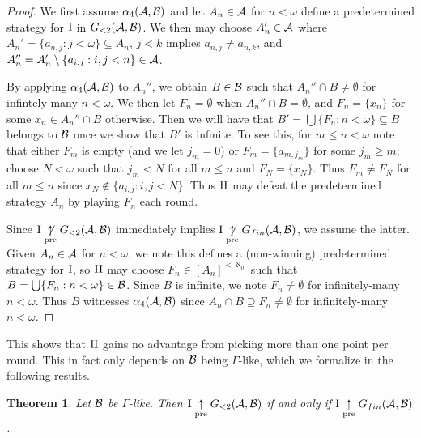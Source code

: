 \documentclass{amsart}
\theoremstyle{plain}
\newtheorem{theorem}{Theorem}
\theoremstyle{definition}
\theoremstyle{remark}
\theoremstyle{plain}
\theoremstyle{definition}
\theoremstyle{remark}
\begin{document}
\begin{proof}
We first assume \(\alpha_4(\mathcal{A},\mathcal{B})\) and let \(A_n\in\mathcal{A}\) for \(n<\omega\)
define a predetermined strategy for \(\mathrm{I}\) in 
\(G_{<2}(\mathcal{A},\mathcal{B})\). We then may choose \(A_n'\in\mathcal{A}\) where
\(A_n'=\{a_{n,j}:j<\omega\}\subseteq A_n\), \(j<k\) implies
\(a_{n,j}\not=a_{n,k}\), and \(A_n''=A_n'\setminus\{a_{i,j}:i,j<n\}\in\mathcal{A}\).

By applying \(\alpha_4(\mathcal{A},\mathcal{B})\) to \(A_n''\), we obtain \(B\in\mathcal{B}\)
such that \(A_n''\cap B\not=\emptyset\) for infintely-many \(n<\omega\).
We then let \(F_n=\emptyset\) when \(A_n''\cap B=\emptyset\), and
\(F_n=\{x_n\}\) for some \(x_n\in A_n''\cap B\) otherwise. Then we will have that
\(B'=\bigcup\{F_n:n<\omega\}\subseteq B\) belongs to \(\mathcal{B}\) once we show that
\(B'\) is infinite. To see this, for \(m\leq n<\omega\) note that either \(F_m\) is
empty (and we let \(j_m=0\)) or \(F_m=\{a_{m,j_m}\}\)
for some \(j_m\geq m\); choose \(N<\omega\) such that \(j_m<N\) for all
\(m\leq n\) and \(F_N=\{x_N\}\). Thus \(F_m\not=F_N\) for all \(m\leq n\) since
\(x_{N}\not\in\{a_{i,j}:i,j< N\}\). Thus \(\mathrm{II}\) may defeat the predetermined
strategy \(A_n\) by playing \(F_n\) each round.

Since \(\mathrm{I}\underset{\text{pre}}{\not\uparrow} G_{<2}(\mathcal{A},\mathcal{B})\) immediately implies
\(\mathrm{I}\underset{\text{pre}}{\not\uparrow} G_{fin}(\mathcal{A},\mathcal{B})\), we assume the latter. Given \(A_n\in\mathcal{A}\)
for \(n<\omega\), we note this defines a (non-winning) predetermined 
strategy for \(\mathrm{I}\), so \(\mathrm{II}\) may choose \(F_n\in[A_n]^{<\aleph_0}\) such that
\(B=\bigcup\{F_n:n<\omega\}\in\mathcal{B}\). Since \(B\) is infinite, we note
\(F_n\not=\emptyset\) for infinitely-many \(n<\omega\). Thus \(B\) witnesses
\(\alpha_4(\mathcal{A},\mathcal{B})\) since \(A_n\cap B\supseteq F_n\not=\emptyset\) for
infinitely-many \(n<\omega\).
\end{proof}

This shows that \(\mathrm{II}\) gains no advantage from picking more than one
point per round. This in fact only depends on \(\mathcal{B}\) being
\(\Gamma\)-like, which we formalize in the following results.

\begin{theorem}
Let \(\mathcal{B}\) be \(\Gamma\)-like. Then \(\mathrm{I}\underset{\text{pre}}{\uparrow} G_{<2}(\mathcal{A},\mathcal{B})\)
if and only if \(\mathrm{I}\underset{\text{pre}}{\uparrow} G_{fin}(\mathcal{A},\mathcal{B})\).
\end{theorem}
\end{document}

